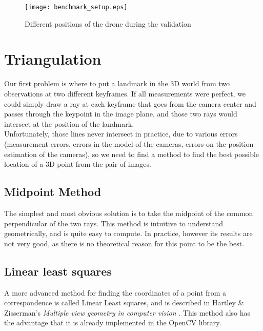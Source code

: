 \begin{figure}[H]
  \centering
  \texttt{[image: benchmark\_setup.eps]}
  \label{fig:benchmarksetup}
  \caption{Different positions of the drone during the validation}
\end{figure}


\section{Triangulation}
Our first problem is where to put a landmark in the 3D world from two observations at two different keyframes. If all measurements were perfect, we could simply draw a ray at each keyframe that goes from the camera center and passes through the keypoint in the image plane, and those two rays would intersect at the position of the landmark. \\
Unfortunately, those lines never intersect in practice, due to various errors (measurement errors, errors in the model of the cameras, errors on the position estimation of the cameras), so we need to find a method to find the best possible location of a 3D point from the pair of images.

\subsection{Midpoint Method}
The simplest and most obvious solution is to take the midpoint of the common perpendicular of the two rays. This method is intuitive to understand geometrically, and is quite easy to compute. In practice, however its results are not very good, as there is no theoretical reason for this point to be the best.

\subsection{Linear least squares}
A more advanced method for finding the coordinates of a point from a correspondence is called Linear Least squares, and is described in Hartley & Zisserman's \textit{Multiple view geometry in computer vision} \cite{multipleviewgeometry}.
This method also has the advantage that it is already implemented in the OpenCV library.


